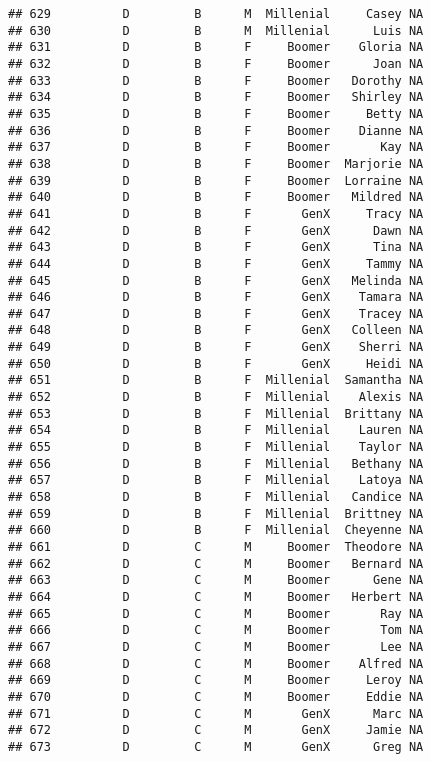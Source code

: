\documentclass[
]{article}
\begin{document}
\begin{verbatim}
## 629          D         B      M  Millenial     Casey NA
## 630          D         B      M  Millenial      Luis NA
## 631          D         B      F     Boomer    Gloria NA
## 632          D         B      F     Boomer      Joan NA
## 633          D         B      F     Boomer   Dorothy NA
## 634          D         B      F     Boomer   Shirley NA
## 635          D         B      F     Boomer     Betty NA
## 636          D         B      F     Boomer    Dianne NA
## 637          D         B      F     Boomer       Kay NA
## 638          D         B      F     Boomer  Marjorie NA
## 639          D         B      F     Boomer  Lorraine NA
## 640          D         B      F     Boomer   Mildred NA
## 641          D         B      F       GenX     Tracy NA
## 642          D         B      F       GenX      Dawn NA
## 643          D         B      F       GenX      Tina NA
## 644          D         B      F       GenX     Tammy NA
## 645          D         B      F       GenX   Melinda NA
## 646          D         B      F       GenX    Tamara NA
## 647          D         B      F       GenX    Tracey NA
## 648          D         B      F       GenX   Colleen NA
## 649          D         B      F       GenX    Sherri NA
## 650          D         B      F       GenX     Heidi NA
## 651          D         B      F  Millenial  Samantha NA
## 652          D         B      F  Millenial    Alexis NA
## 653          D         B      F  Millenial  Brittany NA
## 654          D         B      F  Millenial    Lauren NA
## 655          D         B      F  Millenial    Taylor NA
## 656          D         B      F  Millenial   Bethany NA
## 657          D         B      F  Millenial    Latoya NA
## 658          D         B      F  Millenial   Candice NA
## 659          D         B      F  Millenial  Brittney NA
## 660          D         B      F  Millenial  Cheyenne NA
## 661          D         C      M     Boomer  Theodore NA
## 662          D         C      M     Boomer   Bernard NA
## 663          D         C      M     Boomer      Gene NA
## 664          D         C      M     Boomer   Herbert NA
## 665          D         C      M     Boomer       Ray NA
## 666          D         C      M     Boomer       Tom NA
## 667          D         C      M     Boomer       Lee NA
## 668          D         C      M     Boomer    Alfred NA
## 669          D         C      M     Boomer     Leroy NA
## 670          D         C      M     Boomer     Eddie NA
## 671          D         C      M       GenX      Marc NA
## 672          D         C      M       GenX     Jamie NA
## 673          D         C      M       GenX      Greg NA

\end{verbatim}
\end{document}
